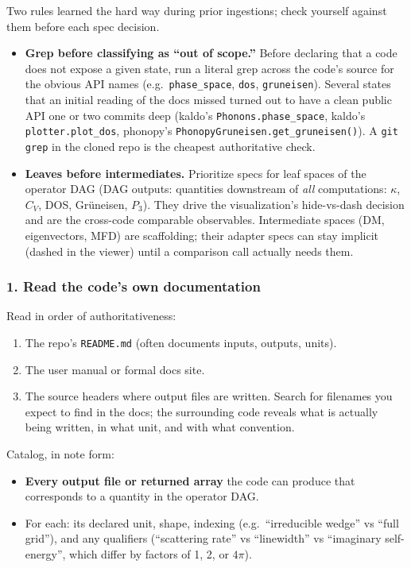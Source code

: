 \documentclass[11pt,a4paper]{article}
\begin{document}
Two rules learned the hard way during prior ingestions; check yourself against
them before each spec decision.

\begin{itemize}[leftmargin=2em]
  \item \textbf{Grep before classifying as ``out of scope.''} Before declaring
        that a code does not expose a given state, run a literal grep across the
        code's source for the obvious API names (e.g.\ \texttt{phase\_space},
        \texttt{dos}, \texttt{gruneisen}). Several states that an initial reading
        of the docs missed turned out to have a clean public API one or two
        commits deep (kaldo's \texttt{Phonons.phase\_space}, kaldo's
        \texttt{plotter.plot\_dos}, phonopy's
        \texttt{PhonopyGruneisen.get\_gruneisen()}). A \texttt{git grep} in the
        cloned repo is the cheapest authoritative check.
  \item \textbf{Leaves before intermediates.} Prioritize specs for leaf spaces of
        the operator DAG (DAG outputs: quantities downstream of \emph{all}
        computations: $\kappa$, $C_V$, DOS, Grüneisen, $P_3$). They drive the
        visualization's hide-vs-dash decision and are the cross-code comparable
        observables. Intermediate spaces (DM, eigenvectors, MFD) are scaffolding;
        their adapter specs can stay implicit (dashed in the viewer) until a
        comparison call actually needs them.
\end{itemize}

\subsubsection*{1. Read the code's own documentation}

Read in order of authoritativeness:
\begin{enumerate}[leftmargin=2em]
  \item The repo's \texttt{README.md} (often documents inputs, outputs, units).
  \item The user manual or formal docs site.
  \item The source headers where output files are written. Search for filenames
        you expect to find in the docs; the surrounding code reveals what is
        actually being written, in what unit, and with what convention.
\end{enumerate}
Catalog, in note form:
\begin{itemize}[leftmargin=2em]
  \item \textbf{Every output file or returned array} the code can produce that
        corresponds to a quantity in the operator DAG.
  \item For each: its declared unit, shape, indexing (e.g.\ ``irreducible wedge''
        vs ``full grid''), and any qualifiers (``scattering rate'' vs
        ``linewidth'' vs ``imaginary self-energy'', which differ by factors of 1,
        2, or $4\pi$).
\end{itemize}
\end{document}
